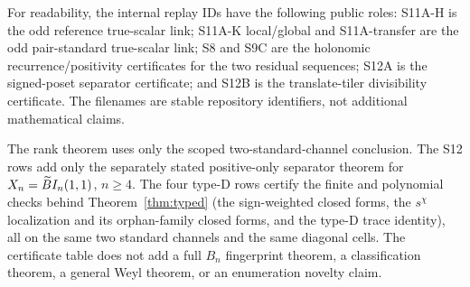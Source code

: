 For readability, the internal replay IDs have the following public roles: S11A-H is the odd reference true-scalar link;
S11A-K local/global and S11A-transfer are the odd pair-standard true-scalar link; S8 and S9C are the holonomic
recurrence/positivity certificates for the two residual sequences; S12A is the signed-poset separator certificate; and
S12B is the translate-tiler divisibility certificate.  The filenames are stable repository identifiers, not additional
mathematical claims.

The rank theorem uses only the scoped two-standard-channel conclusion.  The S12 rows add only the separately stated
positive-only separator theorem for $X_n=\widetilde{B}I_n(1,1)$, $n\ge4$.  The four type-D rows certify the finite and
polynomial checks behind Theorem~\ref{thm:typed} (the sign-weighted closed forms, the $s^{\chi}$ localization and its
orphan-family closed forms, and the type-D trace identity), all on the same two standard channels and the same diagonal
cells.  The certificate table does not add a full $B_n$ fingerprint theorem, a classification theorem, a general Weyl
theorem, or an enumeration novelty claim.
